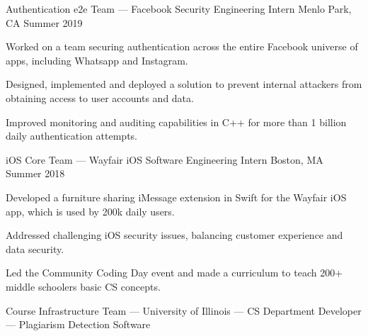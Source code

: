 
\begin{cventries}

\cventry
{Authentication e2e Team — Facebook} %
{Security Engineering Intern} %
{Menlo Park, CA} %
{Summer 2019} %
{
	\begin{cvitems} %
		\item {Worked on a team securing authentication across the entire Facebook universe of apps, including Whatsapp and Instagram.}
		\item {Designed, implemented and deployed a solution to prevent internal attackers from obtaining access to user accounts and data.}
		\item {Improved monitoring and auditing capabilities in C++ for more than 1 billion daily authentication attempts.}
	\end{cvitems}
}
\cventry
{\textnormal{i}OS Core Team — Wayfair} %
{iOS Software Engineering Intern} %
{Boston, MA} %
{Summer 2018} %
{
	\begin{cvitems} %
		\item {Developed a furniture sharing iMessage extension in Swift for the Wayfair iOS app, which is used by 200k daily users.}
		\item {Addressed challenging iOS security issues, balancing customer experience and data security.}
		\item {Led the Community Coding Day event and made a curriculum to teach 200+ middle schoolers basic CS concepts.}
	\end{cvitems}
}
\cventry
{Course Infrastructure Team — University of Illinois — CS Department} %
{Developer — Plagiarism Detection Software} %

\end{cventries}
